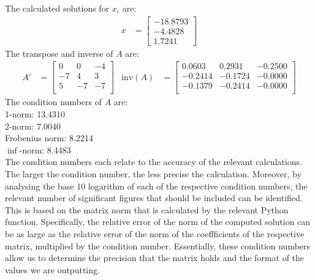 \documentclass{article}
\begin{document}
The calculated solutions for $x_i$ are:
\begin{align*}
x&=\begin{bmatrix}
  -18.8793\\
  -4.4828\\
  1.7241
\end{bmatrix}
\end{align*}
The transpose and inverse of $A$ are:
\begin{align*}
A' &=
\begin{bmatrix}
0 & 0 & -4 \\
-7 & 4 & 3 \\
 5 & -7 & -7 \\
\end{bmatrix} &
\mbox{inv}(A) &= 
\begin{bmatrix}
 0.0603 & 0.2931 & -0.2500 \\
 -0.2414 & -0.1724 & -0.0000 \\
 -0.1379 & -0.2414 & -0.0000 \\
\end{bmatrix}
\end{align*}
The condition numbers of $A$ are: \\
1-norm: 13.4310 \\
2-norm: 7.0040 \\
Frobenius norm: 8.2214 \\
$\inf$-norm: 8.4483 \\

The condition numbers each relate to the accuracy of the relevant calculations. The larger the condition number, the less precise the calculation. Moreover, by analysing the base 10 logarithm of each of the respective condition numbers, the relevant number of significant figures that should be included can be identified. This is based on the matrix norm that is calculated by the relevant Python function. Specifically, the relative error of the norm of the computed solution can be as large as the relative error of the norm of the coeffficients of the respective matrix, multiplied by the condition number. Essentially, these condition numbers allow us to determine the precision that the matrix holds and the format of the values we are outputting.
\end{document}
